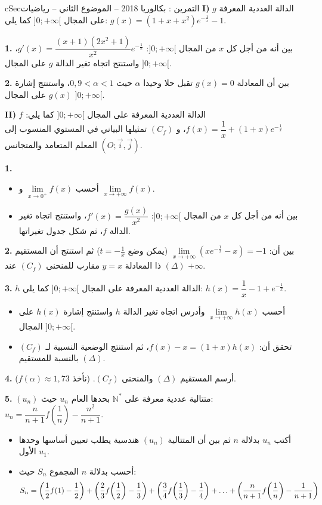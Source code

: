 \documentclass[12pt,a4paper]{article}
\newenvironment{BOX}[2]{\begin{otherlanguage}{english}\begin{arbox}{#1}{#2}}{\end{arbox}\end{otherlanguage}}
\newcounter{exo}
\newenvironment{tamrin}[1]{\stepcounter{exo}\begin{BOX}{cSec}{التمرين \theexo: #1}}{\end{BOX}}
\renewcommand{\dots}{\mathinner{\ldotp\ldotp\ldotp}}
\newcommand{\N}{\mathbb{N}}
\newenvironment{sq}{\begin{itemize}[leftmargin=2.4em,itemsep=3pt]}{\end{itemize}}
\newcommand{\qa}{\item[(أ)]}\newcommand{\qb}{\item[(ب)]}\newcommand{\qc}{\item[(جـ)]}\newcommand{\qd}{\item[(د)]}\newcommand{\qe}{\item[(هـ)]}
\newcommand{\QQ}[1]{\par\smallskip\textbf{#1.} }
\begin{document}
\begin{tamrin}{بكالوريا 2018 -- الموضوع الثاني -- رياضيات}
\textbf{I)} $g$ الدالة العددية المعرفة على المجال $]0;+\infty[$ كما يلي: $g(x)=\left(1+x+x^2\right)e^{-\frac1x}-1$.
\QQ{1} بين أنه من أجل كل $x$ من المجال $]0;+\infty[$: $g'(x)=\dfrac{(x+1)\left(2x^2+1\right)}{x^2}e^{-\frac1x}$، واستنتج اتجاه تغير الدالة $g$ على المجال $]0;+\infty[$.
\QQ{2} بين أن المعادلة $g(x)=0$ تقبل حلا وحيدا $\alpha$ حيث $0{,}9<\alpha<1$، واستنتج إشارة $g(x)$ على المجال $]0;+\infty[$.

\textbf{II)} $f$ الدالة العددية المعرفة على المجال $]0;+\infty[$ كما يلي: $f(x)=\dfrac1x+(1+x)e^{-\frac1x}$، و $(C_f)$ تمثيلها البياني في المستوي المنسوب إلى المعلم المتعامد والمتجانس $(O;\vec i,\vec j)$.
\QQ{1}
\begin{sq}
\qa أحسب $\lim\limits_{x\to0^{+}}f(x)$ و $\lim\limits_{x\to+\infty}f(x)$.
\qb بين أنه من أجل كل $x$ من المجال $]0;+\infty[$: $f'(x)=\dfrac{g(x)}{x^2}$، واستنتج اتجاه تغير الدالة $f$، ثم شكل جدول تغيراتها.
\end{sq}
\QQ{2} بين أن: $\lim\limits_{x\to+\infty}\left(xe^{-\frac1x}-x\right)=-1$ (يمكن وضع $t=-\frac1x$) ثم استنتج أن المستقيم $(\Delta)$ ذا المعادلة $y=x$ مقارب للمنحنى $(C_f)$ عند $+\infty$.
\QQ{3} $h$ الدالة العددية المعرفة على المجال $]0;+\infty[$ كما يلي: $h(x)=\dfrac1x-1+e^{-\frac1x}$.
\begin{sq}
\qa أحسب $\lim\limits_{x\to+\infty}h(x)$ وأدرس اتجاه تغير الدالة $h$ واستنتج إشارة $h(x)$ على المجال $]0;+\infty[$.
\qb تحقق أن: $f(x)-x=(1+x)h(x)$، ثم استنتج الوضعية النسبية لـ $(C_f)$ بالنسبة للمستقيم $(\Delta)$.
\end{sq}
\QQ{4} أرسم المستقيم $(\Delta)$ والمنحنى $(C_f)$. (نأخذ $f(\alpha)\approx1{,}73$).
\QQ{5} $(u_n)$ متتالية عددية معرفة على $\N^{*}$ بحدها العام $u_n$ حيث: $u_n=\dfrac{n}{n+1}f\!\left(\dfrac1n\right)-\dfrac{n^2}{n+1}$.
\begin{sq}
\qa أكتب $u_n$ بدلالة $n$ ثم بين أن المتتالية $(u_n)$ هندسية يطلب تعيين أساسها وحدها الأول $u_1$.
\qb أحسب بدلالة $n$ المجموع $S_n$ حيث:
\[S_n=\left(\frac12f(1)-\frac12\right)+\left(\frac23f\!\left(\frac12\right)-\frac13\right)+\left(\frac34f\!\left(\frac13\right)-\frac14\right)+\dots+\left(\frac{n}{n+1}f\!\left(\frac1n\right)-\frac1{n+1}\right)\]
\end{sq}
\end{tamrin}
\end{document}
